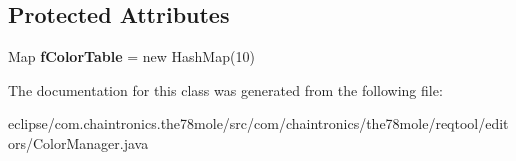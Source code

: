 \subsection*{Protected Attributes}
\begin{DoxyCompactItemize}
\item 
Map {\bfseries f\+Color\+Table} = new Hash\+Map(10)\hypertarget{classcom_1_1chaintronics_1_1the78mole_1_1reqtool_1_1editors_1_1ColorManager_a1aafaee0cc2fb1ab453f342d618f50a7}{}\label{classcom_1_1chaintronics_1_1the78mole_1_1reqtool_1_1editors_1_1ColorManager_a1aafaee0cc2fb1ab453f342d618f50a7}

\end{DoxyCompactItemize}


The documentation for this class was generated from the following file\+:\begin{DoxyCompactItemize}
\item 
eclipse/com.\+chaintronics.\+the78mole/src/com/chaintronics/the78mole/reqtool/editors/Color\+Manager.\+java\end{DoxyCompactItemize}
